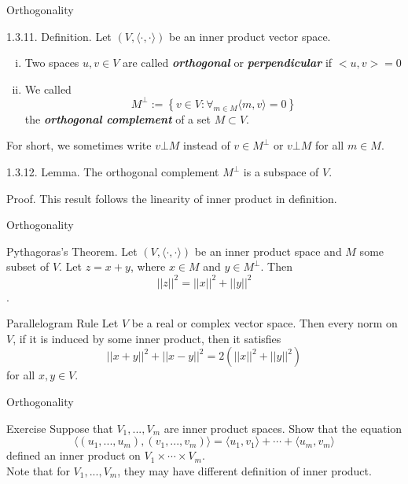 \documentclass[hyperref={pdfpagelabels=true}]{beamer}
\newcommand{\highlightg}[1]{\textcolor[rgb]{0.1,0.5,0.3}{\emph{\textbf{#1}}}}
\newcommand{\<}{\langle}
\renewcommand{\>}{\rangle}
\begin{document}
\begin{frame}{Orthogonality}
    \begin{block}{1.3.11. Definition.}
        Let $(V,\<\cdot,\cdot\>)$ be an inner product vector space.
        \begin{enumerate}[(i)]
            \item Two spaces $u,v \in V$ are called \highlightg{orthogonal} or \highlightg{perpendicular} if $<u,v> = 0$
            \item We called
            \[M^{\bot}:=\left\{v\in V:\forall_{m \in M}\<m,v\> = 0\right\}\]
            the \highlightg{orthogonal complement} of a set $M \subset V$.
        \end{enumerate}
        For short, we sometimes write $v \bot M$ instead of $v \in M^{\bot}$ or $v \bot M$ for all $m \in M$.
    \end{block}
    \begin{block}{1.3.12. Lemma.} The orthogonal complement $M^{\bot}$ is a subspace of $V$.
    \end{block}
    \begin{block}{Proof.}
        This result follows the linearity of inner product in definition.
    \end{block}
\end{frame}
\begin{frame}{Orthogonality}
    \begin{block}{Pythagoras's Theorem.}
        Let $(V,\<\cdot,\cdot\>)$ be an inner product space and $M$ some subset of $V$. Let $z = x + y$, where $x \in M$ and $y \in M^{\bot}$. Then
        \[||z||^{2} = ||x||^{2}+||y||^{2}\].
    \end{block}
    \begin{block}{Parallelogram Rule}
        Let $V$ be a real or complex vector space. Then every norm on $V$, if it is induced by some inner product, then it satisfies 
        \[||x+y||^{2}+||x-y||^{2} = 2(||x||^{2}+||y||^{2})\]
        for all $x,y \in V$.
    \end{block}
\end{frame}
\begin{frame}{Orthogonality}
    \begin{block}{Exercise}
        Suppose that $V_{1},...,V_{m}$ are inner product spaces. Show that the equation
        \[\<(u_{1},...,u_{m}),(v_{1},...,v_{m})\> = \<u_{1},v_{1}\>+\cdots+\<u_{m},v_{m}\>\]
        defined an inner product on $V_{1} \times \cdots \times V_{m}$.\\
        Note that for $V_{1},...,V_{m}$, they may have different definition of inner product.
    \end{block}
\end{frame}
\end{document}
